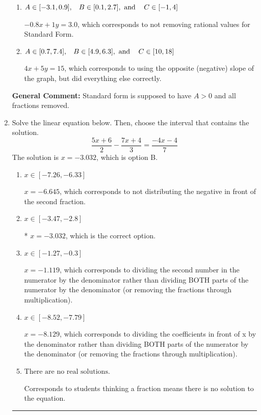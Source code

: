 \documentclass{extbook}[14pt]
\newcommand{\litem}[1]{\item #1

\rule{\textwidth}{0.4pt}}
\begin{document}
\begin{enumerate}
{\begin{enumerate}[label=\Alph*.]
* $4x - 5y = -15$, which is the correct option.
\item \( A \in [-3.1, 0.9], \hspace{3mm} B \in [0.1, 2.7], \text{ and } \hspace{3mm} C \in [-1, 4] \)

 $-0.8x + 1y = 3.0$, which corresponds to not removing rational values for Standard Form.
\item \( A \in [0.7, 7.4], \hspace{3mm} B \in [4.9, 6.3], \text{ and } \hspace{3mm} C \in [10, 18] \)

 $4x + 5y = 15$, which corresponds to using the opposite (negative) slope of the graph, but did everything else correctly.
\end{enumerate}

\textbf{General Comment:} Standard form is supposed to have $A > 0$ and all fractions removed.
}
\litem{
Solve the linear equation below. Then, choose the interval that contains the solution.
\[ \frac{5x + 6}{2} - \frac{7x + 4}{3} = \frac{-4x -4}{7} \]The solution is \( x = -3.032 \), which is option B.\begin{enumerate}[label=\Alph*.]
\item \( x \in [-7.26, -6.33] \)

 $x = -6.645$, which corresponds to not distributing the negative in front of the second fraction.
\item \( x \in [-3.47, -2.8] \)

* $x = -3.032$, which is the correct option.
\item \( x \in [-1.27, -0.3] \)

 $x = -1.119$, which corresponds to dividing the second number in the numerator by the denominator rather than dividing BOTH parts of the numerator by the denominator (or removing the fractions through multiplication).
\item \( x \in [-8.52, -7.79] \)

 $x = -8.129$, which corresponds to dividing the coefficients in front of x by the denominator rather than dividing BOTH parts of the numerator by the denominator (or removing the fractions through multiplication).
\item \( \text{There are no real solutions.} \)

Corresponds to students thinking a fraction means there is no solution to the equation.
\end{enumerate}

}
\end{enumerate}
\end{document}

